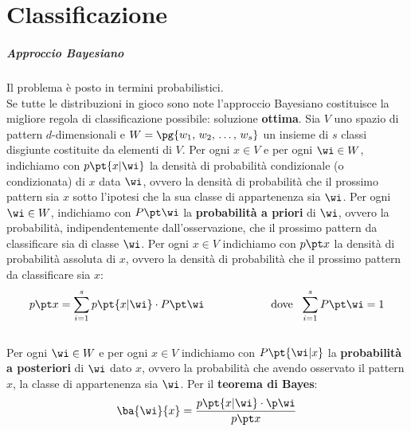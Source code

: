 \chapter{Classificazione}\label{chap:classificazione} %
\paragraph{Approccio Bayesiano}\label{par:approccio_bayesiano} %
Il problema è posto in  termini probabilistici.
\\
Se tutte le distribuzioni in gioco sono note l'approccio Bayesiano costituisce la migliore regola di classificazione possibile: soluzione \textbf{ottima}.
\emptyln{}
Sia $V$ uno spazio di pattern $d$-dimensionali e $W = \pg{w_1,\, w_2,\, \dots,\, w_s}$ un insieme di $s$ classi disgiunte costituite da elementi di $V$.
\emptyln{}
Per ogni $x \in V$ e per ogni $\wi \in W$, indichiamo con $p\pt{x|\wi}$ la densità di probabilità condizionale (o condizionata) di $x$ data $\wi$, ovvero la densità di probabilità che il prossimo pattern sia $x$ sotto l'ipotesi che la sua classe di appartenenza sia $\wi$.
\emptyln{}
Per ogni $\wi \in W$, indichiamo con $P\pt\wi$ la \textbf{probabilità a priori} di $\wi$, ovvero la probabilità, indipendentemente dall'osservazione, che il prossimo pattern da classificare sia di classe $\wi$.
\emptyln{}
Per ogni $x \in V$ indichiamo con $p\pt x$ la densità di probabilità assoluta di $x$, ovvero la densità di probabilità che il prossimo pattern da classificare sia $x$:
\[
    p\pt x = \sum_{i = 1}^{s}{p\pt{x|\wi} \cdot P\pt\wi} \qquad\qquad\qquad \text{dove }\ \sum_{i = 1}^{s}{P\pt\wi} = 1
\]
\\
Per ogni $\wi \in W$ e per ogni $x \in V$ indichiamo con $P\pt{\wi|x}$ la \textbf{probabilità a posteriori} di $\wi$ dato $x$, ovvero la probabilità che avendo osservato il pattern $x$, la classe di appartenenza sia $\wi$.
Per il \textbf{teorema di Bayes}:
\begin{equation}\label{eq:theor-bayes}
    \ba{\wi}{x} = \dfrac{p\pt{x|\wi} \cdot \p\wi}{p\pt x}
\end{equation}
%
